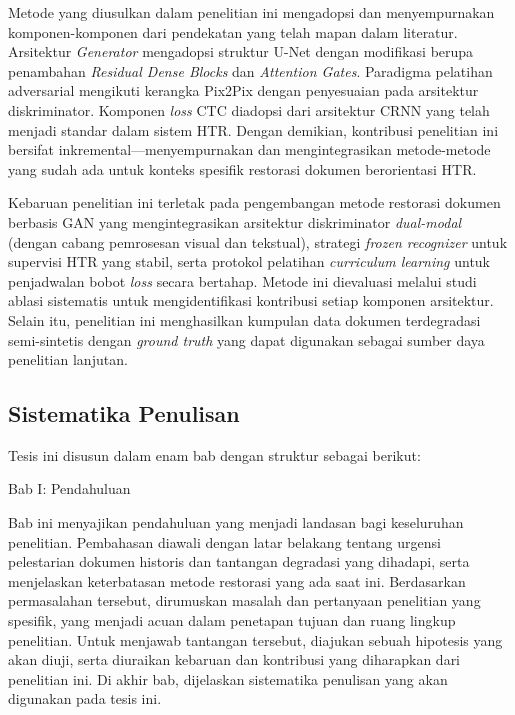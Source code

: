 \documentclass[12pt,a4paper]{article}
\begin{document}
Metode yang diusulkan dalam penelitian ini mengadopsi dan menyempurnakan komponen-komponen dari pendekatan yang telah mapan dalam literatur. Arsitektur \textit{Generator} mengadopsi struktur U-Net \parencite{ronneberger2015} dengan modifikasi berupa penambahan \textit{Residual Dense Blocks} dan \textit{Attention Gates}. Paradigma pelatihan adversarial mengikuti kerangka Pix2Pix \parencite{isola2017} dengan penyesuaian pada arsitektur diskriminator. Komponen \textit{loss} CTC diadopsi dari arsitektur CRNN \parencite{shi2016} yang telah menjadi standar dalam sistem HTR. Dengan demikian, kontribusi penelitian ini bersifat inkremental---menyempurnakan dan mengintegrasikan metode-metode yang sudah ada untuk konteks spesifik restorasi dokumen berorientasi HTR.

Kebaruan penelitian ini terletak pada pengembangan metode restorasi dokumen berbasis GAN yang mengintegrasikan arsitektur diskriminator \textit{dual-modal} (dengan cabang pemrosesan visual dan tekstual), strategi \textit{frozen recognizer} untuk supervisi HTR yang stabil, serta protokol pelatihan \textit{curriculum learning} untuk penjadwalan bobot \textit{loss} secara bertahap. Metode ini dievaluasi melalui studi ablasi sistematis untuk mengidentifikasi kontribusi setiap komponen arsitektur. Selain itu, penelitian ini menghasilkan kumpulan data dokumen terdegradasi semi-sintetis dengan \textit{ground truth} yang dapat digunakan sebagai sumber daya penelitian lanjutan.


\subsection{Sistematika Penulisan}
\label{subsec:sistematika}

Tesis ini disusun dalam enam bab dengan struktur sebagai berikut:


Bab I: Pendahuluan

Bab ini menyajikan pendahuluan yang menjadi landasan bagi keseluruhan penelitian. Pembahasan diawali dengan latar belakang tentang urgensi pelestarian dokumen historis dan tantangan degradasi yang dihadapi, serta menjelaskan keterbatasan metode restorasi yang ada saat ini. Berdasarkan permasalahan tersebut, dirumuskan masalah dan pertanyaan penelitian yang spesifik, yang menjadi acuan dalam penetapan tujuan dan ruang lingkup penelitian. Untuk menjawab tantangan tersebut, diajukan sebuah hipotesis yang akan diuji, serta diuraikan kebaruan dan kontribusi yang diharapkan dari penelitian ini. Di akhir bab, dijelaskan sistematika penulisan yang akan digunakan pada tesis ini.
\end{document}
